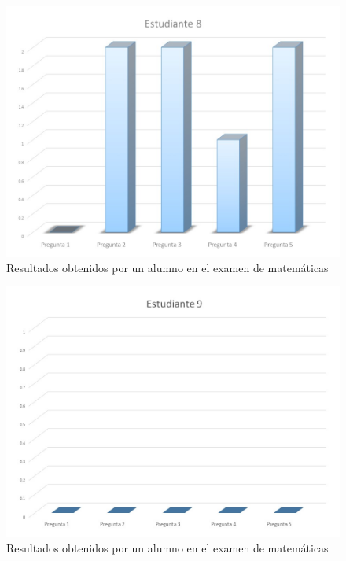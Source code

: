 \documentclass[12pt] {report}
\begin{document}
\begin{figure}[H]
\centering 
\includegraphics[scale=.4]{MEstudiante8.JPG}
\caption{Resultados obtenidos por un alumno en el examen de matemáticas}
\end{figure}
\begin{figure}[H]
\centering 
\includegraphics[scale=.4]{MEstudiante9.JPG}
\caption{Resultados obtenidos por un alumno en el examen de matemáticas}
\end{figure}
\end{document}
